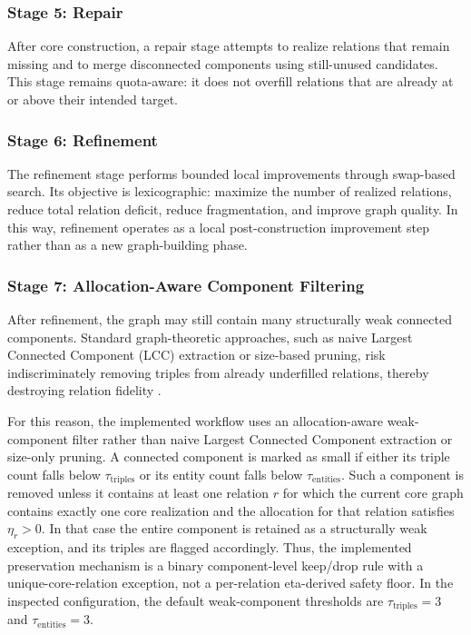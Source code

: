 \documentclass[12pt,a4paper]{article}
\begin{document}
\subsubsection{Stage 5: Repair}

After core construction, a repair stage attempts to realize relations that remain missing and to merge disconnected components using still-unused candidates. This stage remains quota-aware: it does not overfill relations that are already at or above their intended target.

\subsubsection{Stage 6: Refinement}

The refinement stage performs bounded local improvements through swap-based search. Its objective is lexicographic: maximize the number of realized relations, reduce total relation deficit, reduce fragmentation, and improve graph quality. In this way, refinement operates as a local post-construction improvement step rather than as a new graph-building phase.

\subsubsection{Stage 7: Allocation-Aware Component Filtering}

After refinement, the graph may still contain many structurally weak connected components. Standard graph-theoretic approaches, such as naive Largest Connected Component (LCC) extraction or size-based pruning, risk indiscriminately removing triples from already underfilled relations, thereby destroying relation fidelity \cite{leskovec2006sampling}. 

For this reason, the implemented workflow uses an allocation-aware weak-component filter rather than naive Largest Connected Component extraction or size-only pruning. A connected component is marked as small if either its triple count falls below \(\tau_{\mathrm{triples}}\) or its entity count falls below \(\tau_{\mathrm{entities}}\). Such a component is removed unless it contains at least one relation \(r\) for which the current core graph contains exactly one core realization and the allocation for that relation satisfies \(\eta_r > 0\). In that case the entire component is retained as a structurally weak exception, and its triples are flagged accordingly. Thus, the implemented preservation mechanism is a binary component-level keep/drop rule with a unique-core-relation exception, not a per-relation eta-derived safety floor. In the inspected configuration, the default weak-component thresholds are \(\tau_{\mathrm{triples}} = 3\) and \(\tau_{\mathrm{entities}} = 3\).
\end{document}
